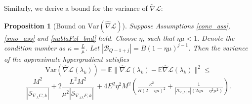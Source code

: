 \documentclass[11pt, twoside]{report}
\newtheorem{proposition}[theorem]{Proposition}
\begin{document}
Similarly, we derive a bound for the variance of $\widetilde{\nabla} \mathcal{L}$:
\begin{proposition}[Bound on $\mathrm{Var}(\widehat{\nabla} \mathcal{L})$] \label{bound_nabla_hat}
Suppose Assumptions \ref{conv_ass}, \ref{smo_ass} and \ref{nablaFxl_bnd} hold. Choose $\eta$, such that $\eta \mu < 1.$ Denote the condition number as $\kappa = \frac{L}{\mu}$. Let $|\mathcal{B}_{Q-1+j}| = B(1-\eta\mu)^{j-1}$. Then the variance of the approximate hypergradient satisfies
\[\mathrm{Var}(\widehat{\nabla} \mathcal{L}(\lambda_k)) = \mathbb{E}\|\widehat{\nabla} \mathcal{L}(\lambda_k) - \mathbb{E}\widehat{\nabla} \mathcal{L}(\lambda_k)\|^2 \leq\]
\[\frac{M^2}{|\mathcal{S}_{\nabla_\lambda C,k}|} 
+ 2 \frac{L^2 M^2}{\mu^2|\mathcal{S}_{\nabla_{x\lambda} F,k}|} \, 
+ 4E^2\eta^2 M^2 \left( \tfrac{\kappa^2}{B (2 - \eta \mu)^2} 
+ \tfrac{1}{|\mathcal{S}_{\nabla_x C,k}|(2\eta \mu - \eta^2 \mu^2)} \right).
\]

    
\end{proposition}
\end{document}
